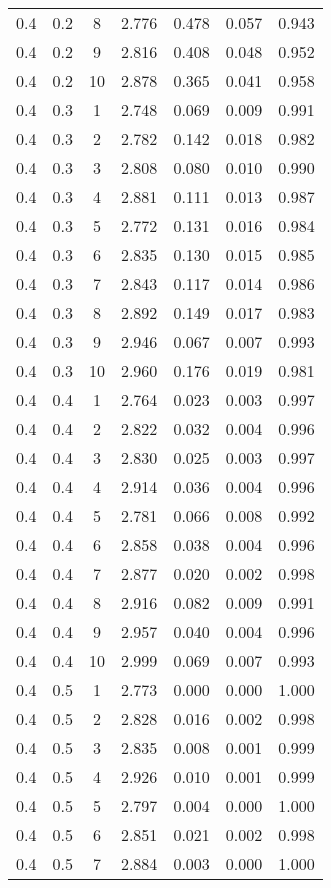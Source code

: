 \begin{tabular}{|c|c|c|c|c|c|c|}
0.4 & 0.2 & 8 & 2.776 & 0.478 & 0.057 & 0.943 \\
0.4 & 0.2 & 9 & 2.816 & 0.408 & 0.048 & 0.952 \\
0.4 & 0.2 & 10 & 2.878 & 0.365 & 0.041 & 0.958 \\
0.4 & 0.3 & 1 & 2.748 & 0.069 & 0.009 & 0.991 \\
0.4 & 0.3 & 2 & 2.782 & 0.142 & 0.018 & 0.982 \\
0.4 & 0.3 & 3 & 2.808 & 0.080 & 0.010 & 0.990 \\
0.4 & 0.3 & 4 & 2.881 & 0.111 & 0.013 & 0.987 \\
0.4 & 0.3 & 5 & 2.772 & 0.131 & 0.016 & 0.984 \\
0.4 & 0.3 & 6 & 2.835 & 0.130 & 0.015 & 0.985 \\
0.4 & 0.3 & 7 & 2.843 & 0.117 & 0.014 & 0.986 \\
0.4 & 0.3 & 8 & 2.892 & 0.149 & 0.017 & 0.983 \\
0.4 & 0.3 & 9 & 2.946 & 0.067 & 0.007 & 0.993 \\
0.4 & 0.3 & 10 & 2.960 & 0.176 & 0.019 & 0.981 \\
0.4 & 0.4 & 1 & 2.764 & 0.023 & 0.003 & 0.997 \\
0.4 & 0.4 & 2 & 2.822 & 0.032 & 0.004 & 0.996 \\
0.4 & 0.4 & 3 & 2.830 & 0.025 & 0.003 & 0.997 \\
0.4 & 0.4 & 4 & 2.914 & 0.036 & 0.004 & 0.996 \\
0.4 & 0.4 & 5 & 2.781 & 0.066 & 0.008 & 0.992 \\
0.4 & 0.4 & 6 & 2.858 & 0.038 & 0.004 & 0.996 \\
0.4 & 0.4 & 7 & 2.877 & 0.020 & 0.002 & 0.998 \\
0.4 & 0.4 & 8 & 2.916 & 0.082 & 0.009 & 0.991 \\
0.4 & 0.4 & 9 & 2.957 & 0.040 & 0.004 & 0.996 \\
0.4 & 0.4 & 10 & 2.999 & 0.069 & 0.007 & 0.993 \\
0.4 & 0.5 & 1 & 2.773 & 0.000 & 0.000 & 1.000 \\
0.4 & 0.5 & 2 & 2.828 & 0.016 & 0.002 & 0.998 \\
0.4 & 0.5 & 3 & 2.835 & 0.008 & 0.001 & 0.999 \\
0.4 & 0.5 & 4 & 2.926 & 0.010 & 0.001 & 0.999 \\
0.4 & 0.5 & 5 & 2.797 & 0.004 & 0.000 & 1.000 \\
0.4 & 0.5 & 6 & 2.851 & 0.021 & 0.002 & 0.998 \\
0.4 & 0.5 & 7 & 2.884 & 0.003 & 0.000 & 1.000 \\

\end{tabular}
